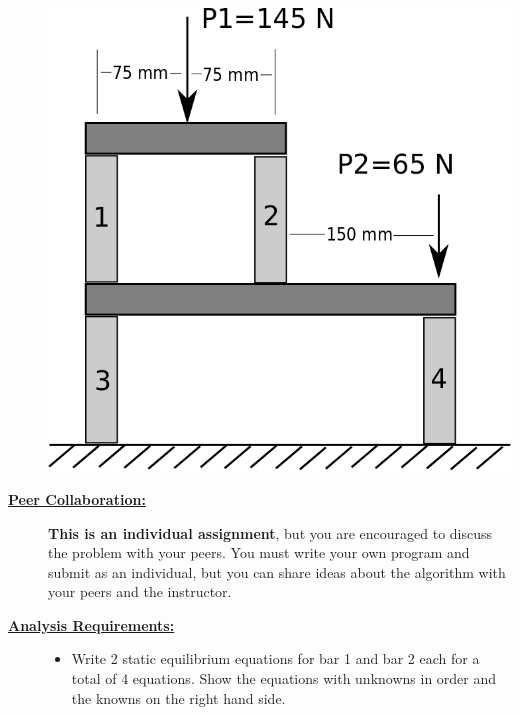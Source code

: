 \documentclass[12pt]{article}
\begin{document}
\begin{description}
	\includegraphics[scale=.25]{activity6_fig1.png}\\
		
	\item[\textbf{\underline{Peer Collaboration:}}] \hfill \vspace{0mm}
	
	{\bf This is an individual assignment}, but you are encouraged to discuss the problem with your peers. You must write your own program and submit as an individual, but you can share ideas about the algorithm with your peers and the instructor.

\newpage	
\item[\textbf{\underline{Analysis Requirements:}}] \hfill \vspace{0mm}

	
	\begin{itemize}
		
	\item Write 2 static equilibrium equations for bar 1 and bar 2 each for a total of 4 equations. Show the equations with unknowns in order and the knowns on the right hand side.\vspace{10mm} \\
	
	

\end{itemize}
\end{description}
\end{document}

